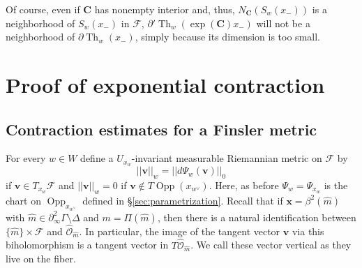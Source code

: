 \documentclass[12pt]{amsbook}%
\theoremstyle{definition}
\theoremstyle{remark}
\numberwithin{section}{chapter}
\numberwithin{subsection}{section}
\numberwithin{figure}{chapter}
\DeclareMathOperator{\Th}{Th}
\DeclareMathOperator{\Opp}{Opp}
\def\cF{{\mathscr{F}}}
\def\cO{{\mathscr{O}}}
\def\CC{{\mathbf{C}}}
\def\bv{\mathbf{v}}
\def\bx{\mathbf{x}}
\def\Ga{\Gamma}
\def\ol{\overline}
\def\kap{}
\begin{document}
{{%

Of course, even if $\CC$ has nonempty interior and, thus, $N_{\CC}(S_w(x_-))$ is a neighborhood of $S_w(x_-)$ in $\cF$, 
$\partial' \Th_w(\exp({\CC})x_-)$ will not be a neighborhood of $\partial \Th_w(x_-)$, simply because its dimension is too small. 






\section{Proof of exponential contraction} 

\subsection{Contraction estimates for a Finsler metric}\label{sec:Contraction estimates}


For every $w\in W$ define a $U_{x_w}$-invariant measurable Riemannian metric on $\cF$ by  
$$
||\bv||_w=||d\Psi_w(\bv)||_0
$$
if $\bv\in T_{x_w}\cF$ and $||\bv||_w= 0$ if $\bv\notin T \Opp(x_{w^\vee})$.  Here, as before $\Psi_w=\Psi_{x_w}$ 
is the chart on $\Opp_{x_{w^\vee}}$ defined in \S \ref{sec:parametrization}.
Recall that if $\bx = \beta^2(\hat{m})$ with $\hat{m} \in \partial^2_\infty \Ga \setminus \Delta$ and $m = \Pi(\hat{m})$, then there is a natural identification between $\{\hat{m} \} \times \cF $ and $\hat{\cO}_{\hat{m}}$. In particular, the image of the tangent vector $\bv$ via this biholomorphism is a tangent vector in $T \hat{\cO}_{\hat{m}}$. We call these vector vertical as they live on the fiber.  

}}
\end{document}
